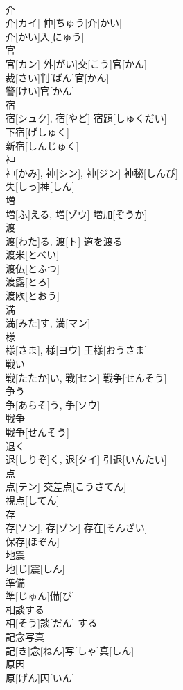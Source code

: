 \documentclass[8pt]{extreport}
\begin{document}
\begin{CJK}{UTF8}{min}
\\	介	
\\	介[カイ]	仲[ちゅう]介[かい] 
\\	介[かい]入[にゅう] 
\\	官	
\\	官[カン]	外[がい]交[こう]官[かん] 
\\	裁[さい]判[ばん]官[かん] 
\\	警[けい]官[かん] 
\\	宿	
\\	宿[シュク], 宿[やど]	宿題[しゅくだい] 
\\	下宿[げしゅく] 
\\	新宿[しんじゅく] 
\\	神	
\\	神[かみ], 神[シン], 神[ジン]	神秘[しんぴ] 
\\	失[しっ]神[しん] 
\\	増	
\\	増[ふ]える, 増[ゾウ]	増加[ぞうか] 
\\	渡	
\\	渡[わた]る, 渡[ト]	道を渡る 
\\	渡米[とべい] 
\\	渡仏[とふつ] 
\\	渡露[とろ] 
\\	渡欧[とおう] 
\\	満	
\\	満[みた]す, 満[マン]	
\\	様	
\\	様[さま], 様[ヨウ]	王様[おうさま] 
\\	戦い	
\\	戦[たたか]い, 戦[セン]	戦争[せんそう] 
\\	争う	
\\	争[あらそ]う, 争[ソウ]	
\\	戦争	
\\	戦争[せんそう]	
\\	退く	
\\	退[しりぞ]く, 退[タイ]	引退[いんたい] 
\\	点	
\\	点[テン]	交差点[こうさてん] 
\\	視点[してん] 
\\	存	
\\	存[ソン], 存[ゾン]	存在[そんざい] 
\\	保存[ほぞん] 
\\	地震	
\\	地[じ]震[しん]	
\\	準備	
\\	準[じゅん]備[び]	
\\	相談する	
\\	相[そう]談[だん] する	
\\	記念写真	
\\	記[き]念[ねん]写[しゃ]真[しん]	
\\	原因	
\\	原[げん]因[いん]	
\end{CJK}
\end{document}
